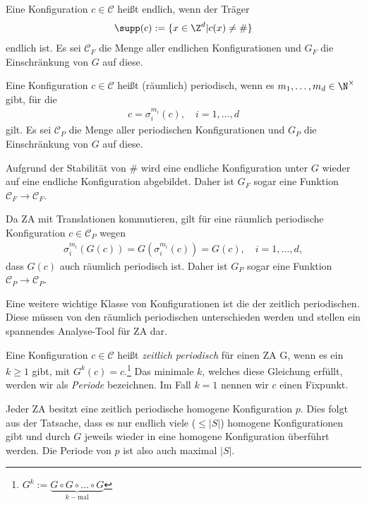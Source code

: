 \begin{definition}
  Eine Konfiguration $c \in \mathcal{C}$ heißt endlich, wenn der Träger
  \begin{align*}
    \supp(c) := \{x \in \Z^d | c(x) \neq \# \}
  \end{align*}
  endlich ist.
  Es sei $\mathcal{C}_F$ die Menge aller endlichen Konfigurationen und $G_F$ die Einschränkung von $G$ auf diese.

  Eine Konfiguration $c \in \mathcal{C}$ heißt (räumlich) periodisch, wenn es $m_1, \dots, m_d \in \N^{\times}$ gibt, für die
  \begin{align*}
    c = \sigma_i^{m_i}(c), \quad i = 1,\dots,d
  \end{align*}
  gilt. Es sei $\mathcal{C}_P$ die Menge aller periodischen Konfigurationen und $G_P$ die Einschränkung von $G$ auf diese.
\end{definition}

Aufgrund der Stabilität von $\#$ wird eine endliche Konfiguration unter $G$ wieder auf eine endliche Konfiguration abgebildet. Daher ist $G_F$ sogar eine Funktion $\mathcal{C}_F \to \mathcal{C}_F$.

Da ZA mit Translationen kommutieren, gilt für eine räumlich periodische Konfiguration $c \in \mathcal{C}_P$ wegen
\begin{align*}
  \sigma_i^{m_i}(G(c)) = G(\sigma_i^{m_i}(c)) = G(c), \quad i = 1,\dots,d,
\end{align*}
dass $G(c)$ auch räumlich periodisch ist. Daher ist $G_P$ sogar eine Funktion $\mathcal{C}_P \to \mathcal{C}_P$.

Eine weitere wichtige Klasse von Konfigurationen ist die der zeitlich periodischen. Diese müssen von den räumlich periodischen unterschieden werden und stellen ein spannendes Analyse-Tool für ZA dar.

\begin{definition}
  Eine Konfiguration $c \in \mathcal{C}$ heißt \textit{zeitlich periodisch} für einen ZA G, wenn es ein $k \geq 1$ gibt, mit $G^k(c) = c$.\footnote{$G^k := \underbrace{G \circ G \circ \dots \circ G}_{k-\text{mal}}$} Das minimale $k$, welches diese Gleichung erfüllt, werden wir als \textit{Periode} bezeichnen. Im Fall $k=1$ nennen wir $c$ einen Fixpunkt.
\end{definition}


Jeder ZA besitzt eine zeitlich periodische homogene Konfiguration $p$. Dies folgt aus der Tatsache, dass es nur endlich viele ($\leq |S|$) homogene Konfigurationen gibt und durch $G$ jeweils wieder in eine homogene Konfiguration überführt werden. Die Periode von $p$ ist also auch maximal $|S|$.


